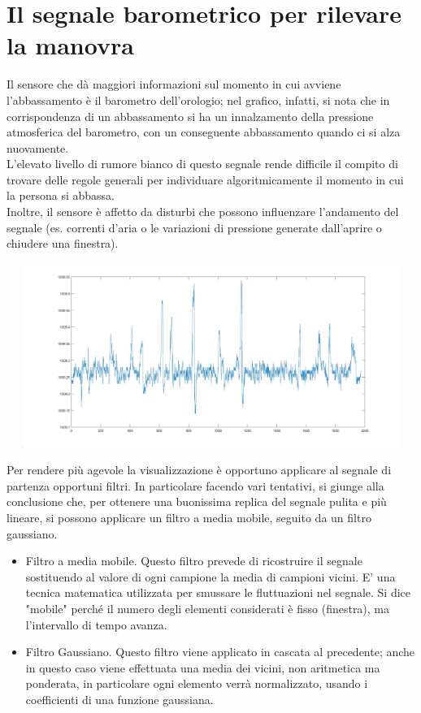\documentclass[a4paper, oneside]{book}
\begin{document}
\section{Il segnale barometrico per rilevare la manovra}


Il sensore che dà maggiori informazioni sul momento in cui avviene l’abbassamento è il barometro dell'orologio; nel grafico, infatti, si nota che in corrispondenza di un abbassamento si ha un innalzamento della pressione atmosferica del barometro, con un conseguente abbassamento quando ci si alza nuovamente.\\
L’elevato livello di rumore bianco di questo segnale rende difficile il compito di trovare delle regole generali per individuare algoritmicamente il momento in cui la persona si abbassa. \\
Inoltre, il sensore è affetto da disturbi che possono influenzare l’andamento del segnale (es. correnti d’aria o le variazioni di pressione generate dall’aprire o chiudere una finestra).
\makebox[\linewidth]{}
\makebox[\linewidth]{}
\begin{minipage}{\linewidth}
\begin{center}
\includegraphics[width=150mm, height= 60mm]{./images/registrazione_tesi/pressure_watch.jpg} 
\end{center}
\end{minipage}
\makebox[\linewidth]{}
\makebox[\linewidth]{} 
Per rendere più agevole la visualizzazione è opportuno applicare al segnale di partenza opportuni filtri. In particolare facendo vari tentativi, si giunge alla conclusione che, per ottenere una buonissima replica del segnale pulita e più lineare, si possono applicare un filtro a media mobile, seguito da un filtro gaussiano.
\begin {itemize}
\item Filtro a media mobile. Questo filtro prevede di ricostruire il segnale sostituendo al valore di ogni campione la media di campioni vicini. E’ una tecnica matematica utilizzata per smussare le fluttuazioni nel segnale. Si dice "mobile" perché il numero degli elementi considerati è fisso (finestra), ma l'intervallo di tempo avanza.
\item Filtro Gaussiano. Questo filtro viene applicato in cascata al precedente; anche in questo caso viene effettuata una media dei vicini, non aritmetica ma ponderata, in particolare ogni elemento verrà normalizzato, usando i coefficienti di una funzione gaussiana.
\end{itemize}
\end{document}
